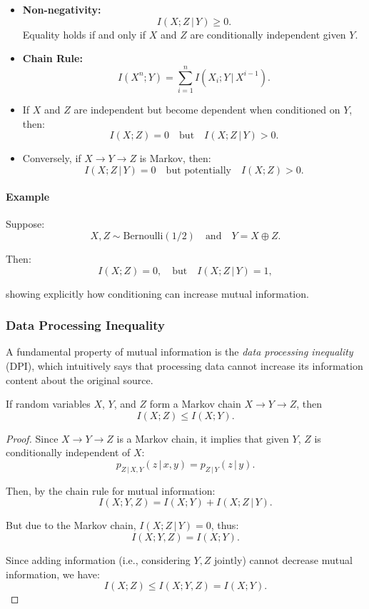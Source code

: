 \begin{itemize}
    \item \textbf{Non-negativity:}
    \[
    I(X;Z\,|\,Y)\geq 0.
    \]
    Equality holds if and only if \(X\) and \(Z\) are conditionally independent given \(Y\).

    \item \textbf{Chain Rule:} 
    \[
    I(X^n;Y)=\sum_{i=1}^{n}I(X_i;Y\,|\,X^{i-1}).
    \]
    \item If \(X\) and \(Z\) are independent but become dependent when conditioned on \(Y\), then:
    \[
    I(X;Z)=0\quad\text{but}\quad I(X;Z\,|\,Y)>0.
    \]

    \item Conversely, if \(X\to Y\to Z\) is Markov, then:
    \[
    I(X;Z\,|\,Y)=0\quad\text{but potentially}\quad I(X;Z)>0.
    \]
\end{itemize}

\paragraph{Example} Suppose:
\[
X,Z\sim\text{Bernoulli}(1/2)\quad\text{and}\quad Y=X\oplus Z.
\]

Then:
\[
I(X;Z)=0,\quad\text{but}\quad I(X;Z\,|\,Y)=1,
\]

showing explicitly how conditioning can increase mutual information.

\subsubsection{Data Processing Inequality}


A fundamental property of mutual information is the \emph{data processing inequality} (DPI), which intuitively says that processing data cannot increase its information content about the original source. 

\begin{theorem}
If random variables \(X\), \(Y\), and \(Z\) form a Markov chain \(X\to Y\to Z\), then
\[
I(X;Z)\leq I(X;Y).
\]
\end{theorem}

\begin{proof}
Since \(X\to Y\to Z\) is a Markov chain, it implies that given \(Y\), \(Z\) is conditionally independent of \(X\):
\[
p_{Z\,|\,X,Y}(z\,|\,x,y) = p_{Z\,|\,Y}(z\,|\,y).
\]

Then, by the chain rule for mutual information:
\[
I(X;Y,Z) = I(X;Y) + I(X;Z\,|\,Y).
\]

But due to the Markov chain, \(I(X;Z\,|\,Y)=0\), thus:
\[
I(X;Y,Z) = I(X;Y).
\]

Since adding information (i.e., considering \(Y,Z\) jointly) cannot decrease mutual information, we have:
\[
I(X;Z) \leq I(X;Y,Z) = I(X;Y).
\]
\end{proof}

